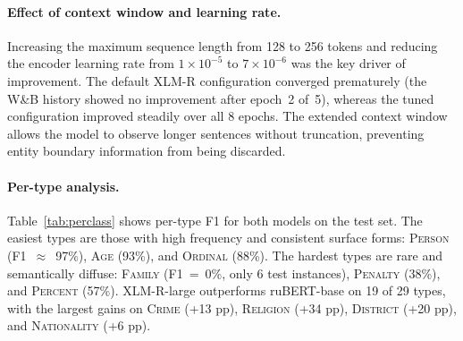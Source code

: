 \documentclass{article}
\begin{document}
\paragraph{Effect of context window and learning rate.}
Increasing the maximum sequence length from 128 to 256 tokens and reducing the
encoder learning rate from $1 \times 10^{-5}$ to $7 \times 10^{-6}$ was the
key driver of improvement.
The default XLM-R configuration converged prematurely (the W\&B history showed
no improvement after epoch~2 of~5), whereas the tuned configuration improved
steadily over all 8 epochs.
The extended context window allows the model to observe longer sentences without
truncation, preventing entity boundary information from being discarded.

\paragraph{Per-type analysis.}
Table~\ref{tab:perclass} shows per-type F1 for both models on the test set.
The easiest types are those with high frequency and consistent surface forms:
\textsc{Person} (F1~$\approx$~97\%), \textsc{Age} (93\%), and
\textsc{Ordinal} (88\%).
The hardest types are rare and semantically diffuse:
\textsc{Family} (F1~=~0\%, only 6 test instances), \textsc{Penalty} (38\%),
and \textsc{Percent} (57\%).
XLM-R-large outperforms ruBERT-base on 19 of 29 types, with the largest
gains on \textsc{Crime} (+13 pp), \textsc{Religion} (+34 pp),
\textsc{District} (+20 pp), and \textsc{Nationality} (+6 pp).
\end{document}
